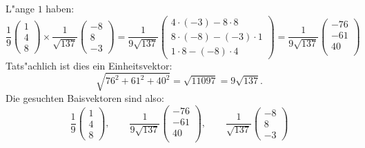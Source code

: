 \begin{loesung}
L"ange $1$ haben:
\[
\frac19
\begin{pmatrix}
1\\4\\8
\end{pmatrix}
\times
\frac1{\sqrt{137}}\begin{pmatrix}-8\\8\\-3\end{pmatrix}
=
\frac1{9\sqrt{137}}
\begin{pmatrix}
4\cdot(-3)-8\cdot 8\\
8\cdot(-8)-(-3)\cdot1\\
1\cdot 8-(-8)\cdot 4
\end{pmatrix}
=
\frac1{9\sqrt{137}}
\begin{pmatrix}
-76\\
-61\\
40\\
\end{pmatrix}
\]
Tats"achlich ist dies ein Einheitsvektor:
\[
\sqrt{76^2+61^2+40^2}=\sqrt{11097}=9\sqrt{137}.
\]
Die gesuchten Baisvektoren sind also: 
\[
\frac19
\begin{pmatrix}
1\\4\\8
\end{pmatrix}
,
\qquad
\frac1{9\sqrt{137}}
\begin{pmatrix}
-76\\
-61\\
40\\
\end{pmatrix},
\qquad
\frac1{\sqrt{137}}
\begin{pmatrix}
-8\\
8\\
-3
\end{pmatrix}
\]


\end{loesung}
